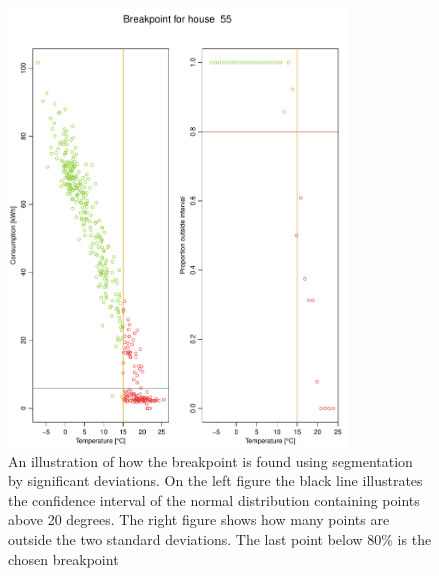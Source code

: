 \begin{figure}
    \centering
    \includegraphics[width=0.8\textwidth]{../../../figures/Breakpoint_55.pdf}
    \caption{An illustration of how the breakpoint is found using segmentation by significant deviations. On the left figure the black line illustrates the confidence interval of the normal distribution containing points above 20 degrees. The right figure shows how many points are outside the two standard deviations. The last point below 80\% is the chosen breakpoint}
    \label{fig: Breakpoint55}
\end{figure}
